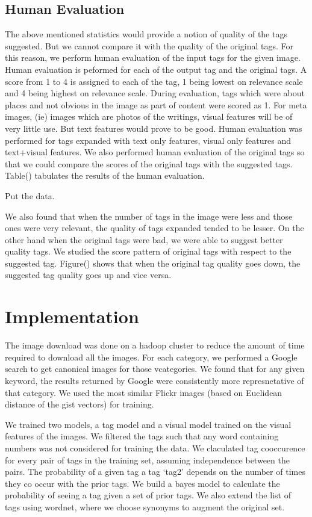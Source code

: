 \documentclass[12pt]{article}
\begin{document}
\subsection{Human Evaluation}
The above mentioned statistics would provide a notion of quality of the tags suggested. But
we cannot compare it with the quality of the original tags. For this reason, we perform human
evaluation of the input tags for the given image. Human evaluation is peformed for each of the
output tag and the original tags. A score from 1 to 4 is assigned to each of the tag, 1 being
lowest on relevance scale and 4 being highest on relevance scale. During evaluation, tags which
were about places and not obvious in the image as part of content were scored as 1. For meta images,
(ie) images which are photos of the writings, visual features will be of very little use. But
text features would prove to be good. Human evaluation was performed for tags expanded with
text only features, visual only features and text+visual features. We also performed human
evaluation of the original tags so that we could compare the scores of the original tags with
the suggested tags. Table() tabulates the results of the human evaluation.

Put the data.

We also found that when the number of tags in the image were less and those ones were very relevant,
the quality of tags expanded tended to be lesser. On the other hand when the original tags were bad,
we were able to suggest better quality tags. We studied the score pattern of original tags with respect
to the suggested tag. Figure() shows that when the original tag quality goes down, the suggested tag
quality goes up and vice versa.

\section{Implementation}
The image download was done on a hadoop cluster to reduce the amount of time
required to download all the images.
For each category, we performed a Google search to get canonical images for
those vcategories. We found that for any given keyword, the results returned
by Google were consistently more represnetative of that category. We used the
most similar Flickr images (based on Euclidean distance of the gist vectors)
for training.

We trained two models, a tag model and a visual model trained on the visual
features of the images. We filtered the tags such that any word containing
numbers was not considered for training the data. We claculated tag
cooccurence for every pair of tags in the training set, assuming independence
between the pairs. The probability of a given tag  a tag `tag2' depends
on the number of times they co occur with the prior tags. We build a bayes model to calculate the
probability of seeing a tag given a set of prior tags. We also extend the list
of tags using wordnet, where we choose synonyms to augment the original set.
\end{document}

